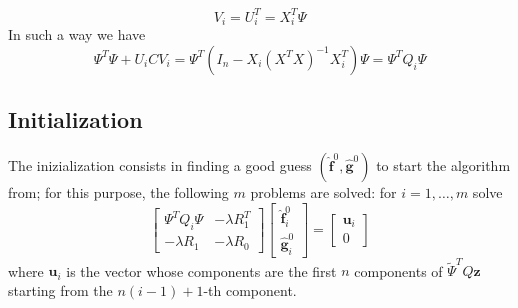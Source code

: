 \begin{equation}
    V_i = U_i^T = X^T_i\Psi
\end{equation}
In such a way we have
\begin{equation}
    \Psi^T\Psi +  U_iCV_i = \Psi^T \left( I_n-X_i\left(X^TX\right)^{-1}X_i^T \right) \Psi = \Psi^T Q_i \Psi
\end{equation}

\subsection{Initialization}
The inizialization consists in finding a good guess $(\hat{\mathbf{f}}^0,\hat{\mathbf{g}}^0)$ to start the algorithm from; for this purpose, the following $m$ problems are solved: for $i = 1, \dots, m$ solve
\begin{equation}
        \begin{bmatrix}
            \Psi^TQ_i\Psi & -\lambda R_1^T\\
            -\lambda R_1  & -\lambda R_0
        \end{bmatrix}
        \begin{bmatrix}
            \hat{\mathbf{f}}_i^0\\
            \hat{\mathbf{g}}_i^0
        \end{bmatrix}
        =
        \begin{bmatrix}
            \mathbf{u}_i\\
            0
        \end{bmatrix}
\end{equation}
where $\mathbf{u}_i$ is the vector whose components are the first $n$ components of $\tilde{\Psi}^T Q\mathbf{z}$ starting from the $n(i-1) +1$-th component.

